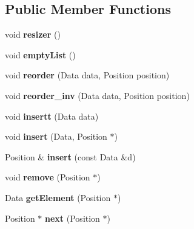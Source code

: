 \subsection*{Public Member Functions}
\begin{DoxyCompactItemize}
\item 
\mbox{\label{class_array_list_a51b1ac71633b2903de328170dc5b9eb9}} 
void {\bfseries resizer} ()
\item 
\mbox{\label{class_array_list_a17e5748065133b10e0baf6a0d53d621e}} 
void {\bfseries empty\+List} ()
\item 
\mbox{\label{class_array_list_a8dd688c1bd165785e6960afe597fe81b}} 
void {\bfseries reorder} (Data data, Position position)
\item 
\mbox{\label{class_array_list_a9587a052d1433bfa89fd31e573f06c36}} 
void {\bfseries reorder\+\_\+inv} (Data data, Position position)
\item 
\mbox{\label{class_array_list_adf1a83e0c2e620909f1bed069ce30a73}} 
void {\bfseries insertt} (Data data)
\item 
\mbox{\label{class_array_list_ab8bea1e4dc8b60b984bfd9b14008ee7d}} 
void {\bfseries insert} (Data, Position $\ast$)
\item 
\mbox{\label{class_array_list_aa99e6236fc1a6f8d42c83d4d503f3794}} 
Position \& {\bfseries insert} (const Data \&d)
\item 
\mbox{\label{class_array_list_a86044618d06ad064bdb43461f87a1d55}} 
void {\bfseries remove} (Position $\ast$)
\item 
\mbox{\label{class_array_list_a1e8699311db3c7341d0cffacd54e9c7d}} 
Data {\bfseries get\+Element} (Position $\ast$)
\item 
\mbox{\label{class_array_list_aa5e024be6f38dc20b695a1eef27dfb0a}} 
Position $\ast$ {\bfseries next} (Position $\ast$)
\item 
\mbox{\label{class_array_list_a29582f955cc0f96c98dc39e8c170d553}} 

\end{DoxyCompactItemize}
